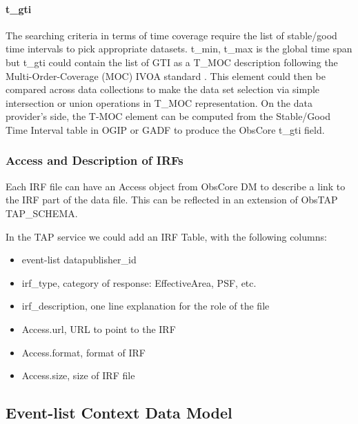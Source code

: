 \documentclass[11pt,a4paper]{ivoa}
\begin{document}
{


\paragraph{t\_gti}

The searching criteria in terms of time coverage require the list of stable/good time intervals to pick appropriate datasets.
t\_min, t\_max is the global time span but t\_gti could contain the list of GTI as a T\_MOC description following the Multi-Order-Coverage (MOC) IVOA standard \citep{2022ivoa.spec.0727F}.
This element could then be compared across data collections to make the data set selection via simple intersection or union operations in T\_MOC representation.
On the data provider's side, the T-MOC element can be computed from the Stable/Good Time Interval table in OGIP or GADF to produce the ObsCore t\_gti field.




\subsubsection{Access and Description of IRFs}

Each IRF file can have an Access object from ObsCore DM to describe a link to the IRF part of the data file.
This can be reflected in an extension of ObsTAP TAP\_SCHEMA.

In the TAP service we could add an IRF Table, with the following columns:

\begin{itemize}
    \item event-list datapublisher\_id
    \item irf\_type, category of response: EffectiveArea, PSF, etc.
    \item irf\_description, one line explanation for the role of the file
    \item Access.url, URL to point to the IRF
    \item Access.format, format of IRF
    \item Access.size, size of IRF file
\end{itemize}



\subsection{Event-list Context Data Model}
\label{sec:EventListContext}

}
\end{document}
